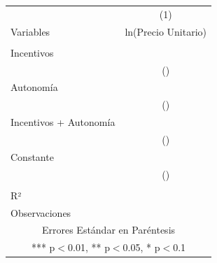 \documentclass[a4paper, answers, addpoints, 11pt]{exam}
\begin{document}
\begin{enumerate}
    \begin{table}[H]
        \centering
        \begin{tabular}{lc} \hline
 & (1) \\
Variables & ln(Precio Unitario) \\ \hline
 &  \\
Incentivos &  \\
 & () \\
Autonomía &  \\
 & () \\
 Incentivos + Autonomía&  \\
 & () \\
Constante &  \\
 & () \\
 &  \\
R² &  \\
Observaciones &  \\ \hline
\multicolumn{2}{c}{ Errores Estándar en Paréntesis} \\
\multicolumn{2}{c}{ *** p$<$0.01, ** p$<$0.05, * p$<$0.1} \\
\end{tabular}
    \end{table}


\end{enumerate}
\end{document}
